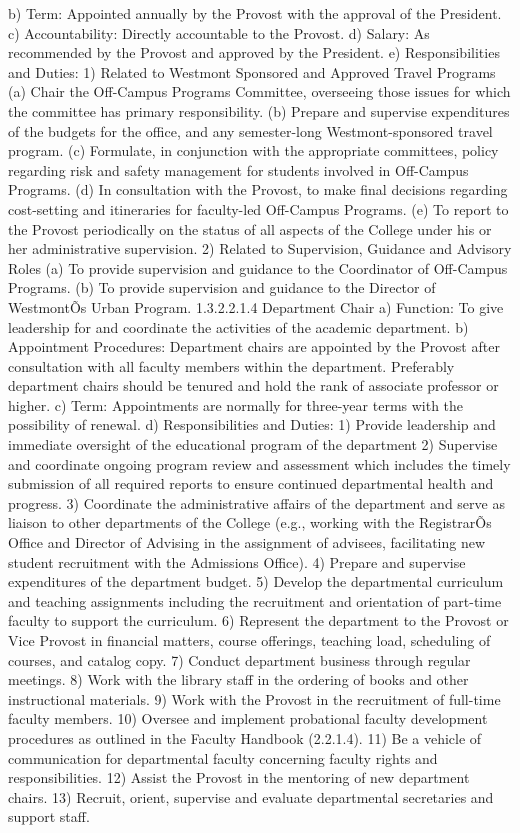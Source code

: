 \documentclass[letterpaper, 11pt]{article}
\begin{document}
b) Term:  Appointed annually by the Provost with the approval of the President.
c) Accountability:  Directly accountable to the Provost.
d) Salary:  As recommended by the Provost and approved by the President.
e) Responsibilities and Duties:
1) Related to Westmont Sponsored and Approved Travel Programs
(a) Chair the Off-Campus Programs Committee, overseeing those issues for which the committee has primary responsibility.
(b) Prepare and supervise expenditures of the budgets for the office, and any semester-long Westmont-sponsored travel program.
(c) Formulate, in conjunction with the appropriate committees, policy regarding risk and safety management for students involved in Off-Campus Programs.
(d) In consultation with the Provost, to make final decisions regarding cost-setting and itineraries for faculty-led Off-Campus Programs.
(e) To report to the Provost periodically on the status of all aspects of the College under his or her administrative supervision.
2) Related to Supervision, Guidance and Advisory Roles
(a) To provide supervision and guidance to the Coordinator of Off-Campus Programs.
(b) To provide supervision and guidance to the Director of WestmontÕs Urban Program.
1.3.2.2.1.4 Department Chair
a) Function:  To give leadership for and coordinate the activities of the academic department.
b) Appointment Procedures:  Department chairs are appointed by the Provost after consultation with all faculty members within the department.  Preferably department chairs should be tenured and hold the rank of associate professor or higher.
c) Term:  Appointments are normally for three-year terms with the possibility of renewal.
d) Responsibilities and Duties:
1) Provide leadership and immediate oversight of the educational program of the department
2) Supervise and coordinate ongoing program review and assessment which includes the timely submission of all required reports to ensure continued departmental health and progress.
3) Coordinate the administrative affairs of the department and serve as liaison to other departments of the College (e.g., working with the RegistrarÕs Office and Director of Advising in the assignment of advisees, facilitating new student recruitment with the Admissions Office).
4) Prepare and supervise expenditures of the department budget.
5) Develop the departmental curriculum and teaching assignments including the recruitment and orientation of part-time faculty to support the curriculum.
6) Represent the department to the Provost or Vice Provost in financial matters, course offerings, teaching load, scheduling of courses, and catalog copy.
7) Conduct department business through regular meetings.
8) Work with the library staff in the ordering of books and other instructional materials.
9) Work with the Provost in the recruitment of full-time faculty members.
10) Oversee and implement probational faculty development procedures as outlined in the Faculty Handbook (2.2.1.4).
11) Be a vehicle of communication for departmental faculty concerning faculty rights and responsibilities.
12) Assist the Provost in the mentoring of new department chairs.
13) Recruit, orient, supervise and evaluate departmental secretaries and support staff.
\end{document}
